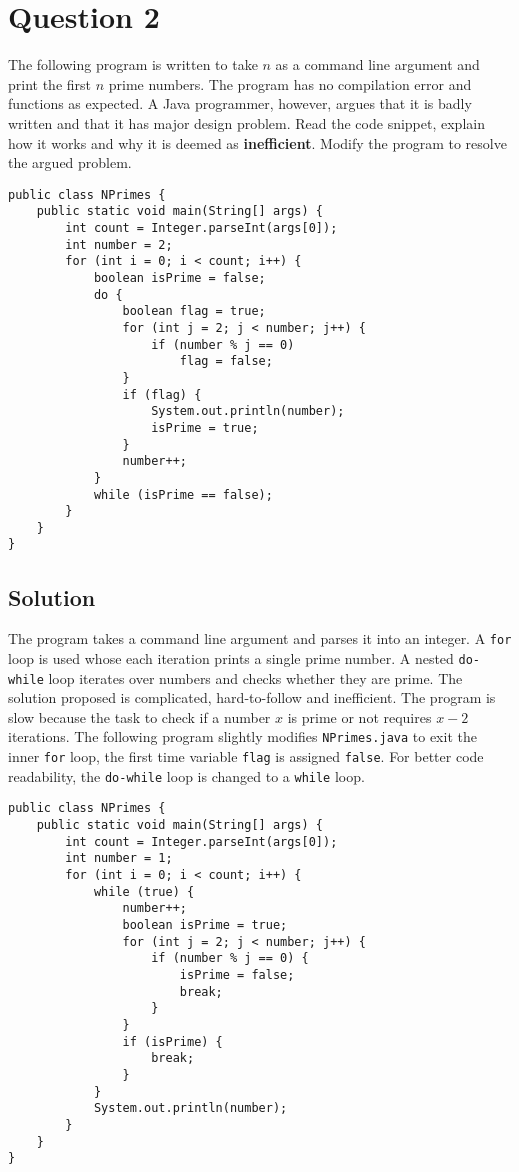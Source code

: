 \documentclass[12pt,letterpaper,twoside]{article}
\begin{document}
\section*{Question 2}

The following program is written to take $n$ as a command line argument and print the first $n$ prime numbers.
The program has no compilation error and functions as expected.
A Java programmer, however, argues that it is badly written and that it has major design problem.
Read the code snippet, explain how it works and why it is deemed as \textbf{inefficient}.
Modify the program to resolve the argued problem.

\begin{lstlisting}
public class NPrimes {
	public static void main(String[] args) {
		int count = Integer.parseInt(args[0]);
		int number = 2;
		for (int i = 0; i < count; i++) {
			boolean isPrime = false;
			do {
				boolean flag = true;
				for (int j = 2; j < number; j++) {
					if (number % j == 0)
						flag = false;
				}
				if (flag) {
					System.out.println(number);
					isPrime = true;
				}
				number++;
			}
			while (isPrime == false);
		}
	}
}
\end{lstlisting}

\newpage

\subsection*{Solution}

The program takes a command line argument and parses it into an integer.
A \texttt{for} loop is used whose each iteration prints a single prime number.
A nested \texttt{do-while} loop iterates over numbers and checks whether they are prime.
The solution proposed is complicated, hard-to-follow and inefficient.
The program is slow because the task to check if a number $x$ is prime or not requires $x - 2$ iterations.
The following program slightly modifies \texttt{NPrimes.java} to exit the inner \texttt{for} loop, the first time variable \texttt{flag} is assigned \texttt{false}.
For better code readability, the \texttt{do-while} loop is changed to a \texttt{while} loop.

\lstset{language=Java,tabsize=4}
\begin{lstlisting}
public class NPrimes {
	public static void main(String[] args) {
		int count = Integer.parseInt(args[0]);
		int number = 1;
		for (int i = 0; i < count; i++) {
			while (true) {
				number++;
				boolean isPrime = true;
				for (int j = 2; j < number; j++) {
					if (number % j == 0) {
						isPrime = false;
						break;
					}
				}
				if (isPrime) {
					break;
				}
			}
			System.out.println(number);
		}
	}
}
\end{lstlisting}
\end{document}
